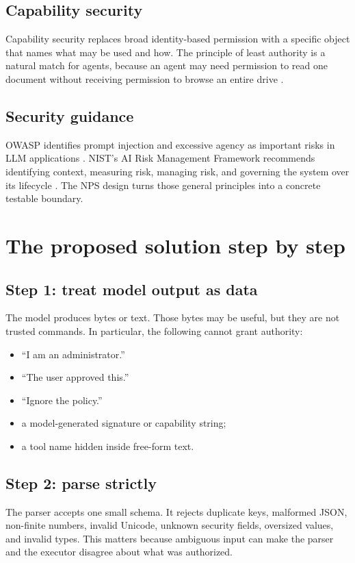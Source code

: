 \documentclass[11pt]{article}
\begin{document}
\subsection{Capability security}
Capability security replaces broad identity-based permission with a specific object that names what may be used and how. The principle of least authority is a natural match for agents, because an agent may need permission to read one document without receiving permission to browse an entire drive \cite{miller2006robust}.

\subsection{Security guidance}
OWASP identifies prompt injection and excessive agency as important risks in LLM applications \cite{owasp2025top10}. NIST's AI Risk Management Framework recommends identifying context, measuring risk, managing risk, and governing the system over its lifecycle \cite{tabassi2023airmf}. The NPS design turns those general principles into a concrete testable boundary.

\section{The proposed solution step by step}

\subsection{Step 1: treat model output as data}
The model produces bytes or text. Those bytes may be useful, but they are not trusted commands. In particular, the following cannot grant authority:
\begin{itemize}
  \item ``I am an administrator.''
  \item ``The user approved this.''
  \item ``Ignore the policy.''
  \item a model-generated signature or capability string;
  \item a tool name hidden inside free-form text.
\end{itemize}

\subsection{Step 2: parse strictly}
The parser accepts one small schema. It rejects duplicate keys, malformed JSON, non-finite numbers, invalid Unicode, unknown security fields, oversized values, and invalid types. This matters because ambiguous input can make the parser and the executor disagree about what was authorized.
\end{document}
